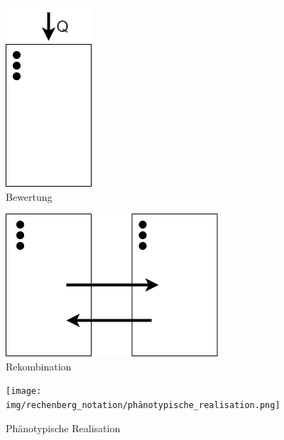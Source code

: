 \begin{figure}[!htb]
	\centering
	\includegraphics[scale=0.5]{img/rechenberg_notation/bewertung.png}
	\caption{Bewertung}
\label{fig:bewertung}
\end{figure}
\begin{figure}[!htb]
	\centering
	\includegraphics[scale=0.5]{img/rechenberg_notation/rekombination.png}
	\caption{Rekombination}
\label{fig:rekombination}
\end{figure}
\begin{figure}[!htb]
	\centering
	\texttt{[image: img/rechenberg\_notation/phänotypische\_realisation.png]}
	\caption{Phänotypische Realisation}
\label{fig:phänotypische_realisation}
\end{figure}


